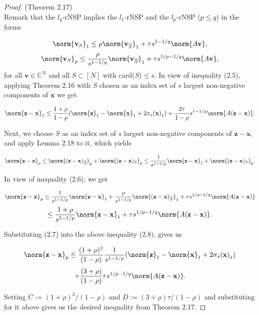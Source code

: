 \begin{proof}(Theorem 2.17)
\\Remark that the $l_q$-rNSP implies the $l_1$-rNSP and the $l_p$-rNSP ($p \leq q$) in the forms

\begin{equation}
\norm{ \mathbf{v}_{S}}_{1}  \leq  \rho \norm{ \mathbf{v}_{\overline{S}}}_{1} + \tau s^{1-1/q} \norm{A\mathbf{v}},
\end{equation}
\begin{equation}
\norm{ \mathbf{v}_{S}}_{p}  \leq   \frac{\rho}{s^{1-1/q}} \norm{ \mathbf{v}_{\overline{S}}}_{1} + \tau s^{1/p-1/q} \norm{A\mathbf{v}},
\end{equation}
for all $\mathbf{v} \in \mathbb{C}^N$ and all $S \subset [N]$ with card($S$)$ \leq s$. In view of inequality (2.5), applying Theorem 2.16 with $S$ chosen as an index set of $s$ largest non-negative components of $\mathbf{x}$ we get

\begin{equation}
\norm{\mathbf{z-x}}_{1} \leq \frac{1 + \rho}{1 - \rho}(\norm{\mathbf{z}}_1-\norm{\mathbf{x}}_1+2\sigma_s \mathbf{(x)}_1) + \frac{2\tau}{1-\rho}s^{1-1/q}\norm{A(\mathbf{z-x})}.
\end{equation}

Next, we choose $S$ as an index set of $s$ largest non-negative components of $\mathbf{z-x}$, and apply Lemma 2.18 to it, which yields

\begin{equation*}
\norm{\mathbf{z-x}}_{p} \leq \norm{(\mathbf{z-x})_{\overline{S}}}_{p} + \norm{(\mathbf{z-x})_S}_{p} \leq \frac{1}{s^{1-1/p}}\norm{\mathbf{z-x}}_1 + \norm{(\mathbf{z-x})_S}_{p}.
\end{equation*}

In view of inequality (2.6), we get

\begin{equation*}
\norm{\mathbf{z-x}}_{p} \leq \frac{1}{s^{1-1/p}}\norm{\mathbf{z-x}}_1 + \frac{\rho}{s^{1-1/p}}\norm{(\mathbf{z-x})_{\overline{S}}}_{1} + \tau s^{1/p-1/q}\norm{A(\mathbf{z-x})}
\end{equation*}
\begin{equation}
\leq \frac{1+\rho}{s^{1-1/p}}\norm{\mathbf{z-x}}_1 + \tau s^{1/p-1/q}\norm{A(\mathbf{z-x})}.
\end{equation}

Substituting (2.7) into the above inequality (2.8), gives us

\begin{equation*}
\norm{\mathbf{z-x}}_{p} \leq \frac{(1+\rho)^2}{(1-\rho)} \frac{1}{s^{1-1/p}}(\norm{\mathbf{z}}_1-\norm{\mathbf{x}}_1 + 2\sigma_s \mathbf{(x)}_1) 
\end{equation*}
\begin{equation*}
+ \frac{(3+\rho)}{(1-\rho)}\tau s^{1/p-1/q} \norm{A(\mathbf{z-x})}.
\end{equation*}

Setting $C:=(1+\rho)^2/(1-\rho)$ and $D:=(3+\rho)\tau/(1-\rho)$ and substituting for it above gives us the desired inequality from Theorem 2.17.


\end{proof}


